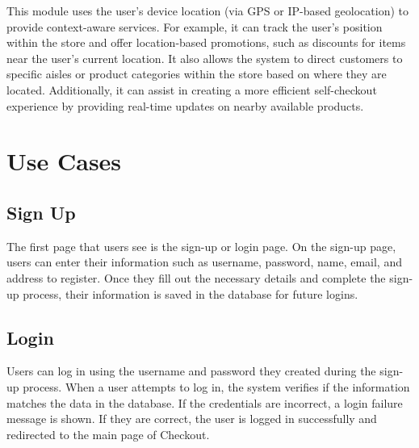\documentclass[conference]{IEEEtran}
\begin{document}
This module uses the user’s device location (via GPS or IP-based geolocation) to provide context-aware services. For example, it can track the user’s position within the store and offer location-based promotions, such as discounts for items near the user’s current location. It also allows the system to direct customers to specific aisles or product categories within the store based on where they are located. Additionally, it can assist in creating a more efficient self-checkout experience by providing real-time updates on nearby available products.


\section{Use Cases}
\subsection{Sign Up}
The first page that users see is the sign-up or login page. On the sign-up page, users can enter their information such as username, password, name, email, and address to register. Once they fill out the necessary details and complete the sign-up process, their information is saved in the database for future logins.

\subsection{Login}
Users can log in using the username and password they created during the sign-up process. When a user attempts to log in, the system verifies if the information matches the data in the database. If the credentials are incorrect, a login failure message is shown. If they are correct, the user is logged in successfully and redirected to the main page of Checkout.
\end{document}
